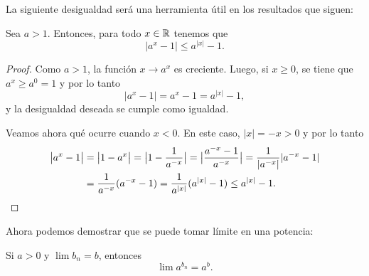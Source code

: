 La siguiente desigualdad será una herramienta útil en los resultados que siguen:

\begin{lemma}
    Sea $a > 1$. Entonces, para todo $x\in\mathbb{R}$ tenemos que
    \[
    \big| a^x - 1 \big| \le a^{|x|}-1.
    \]
\end{lemma}

\begin{proof}
Como $a>1$, la función $x\to a^x$ es creciente. Luego,
    si $x\ge 0$, se tiene que $a^x \ge a^0 = 1$ y por lo tanto
    \[
    \big| a^x - 1 \big| = a^x - 1 = a^{|x|} - 1,
    \]
    y la desigualdad deseada se cumple como igualdad.

    Veamos ahora qué ocurre cuando $x<0$. En este caso, $|x| = -x > 0$ y por lo tanto
    \begin{align*}
        \big| a^x - 1 \big| &= \big| 1 - a^x \big|
        = \big| 1 - \frac{1}{a^{-x}} \big|
        = \big| \frac{a^{-x} - 1}{a^{-x}} \big| 
        = \frac{1}{|a^{-x}|} |a^{-x}-1|
        \\
        &=  \frac{1}{a^{-x}} (a^{-x}-1)
        =  \frac{1}{a^{|x|}} (a^{|x|}-1)
        \le a^{|x|}-1.  \qedhere
    \end{align*}
\end{proof}

Ahora podemos demostrar que se puede tomar límite en una potencia:

\begin{lemma}\label{L:exp continua}
    Si $a>0$ y $\lim b_n = b$, entonces
    \[
    \lim a^{b_n} = a^b.
    \]
\end{lemma}

